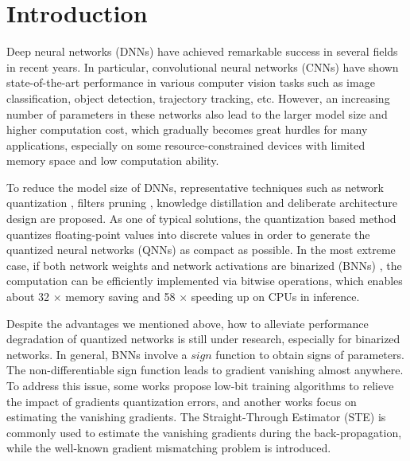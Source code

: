 \documentclass[runningheads]{llncs}
\begin{document}
\section{Introduction}
Deep neural networks (DNNs) have achieved remarkable success in several fields in recent years.
In particular, convolutional neural networks (CNNs) have shown state-of-the-art
performance in various computer vision tasks such as image classification, object detection, trajectory tracking, etc.
However, an increasing number of parameters in these networks also
lead to the larger model size and higher computation cost,
which gradually becomes great hurdles for many applications,
especially on some resource-constrained devices with limited memory space
and low computation ability.

To reduce the model size of DNNs,
representative techniques such as
network quantization \cite{Zhou2016DoReFa,hou2016loss,pact2018,jung2019learning,lahoud2019self},
filters pruning \cite{Luo2017ThiNet,he2017channel,liu2017learning},
knowledge distillation \cite{Hinton2015Distilling,BSS2019,liu2019kr}
and deliberate architecture design \cite{Li2017,cheng2017survey} are proposed.
As one of typical solutions, the quantization based method quantizes
floating-point values into discrete values in order to generate the quantized neural networks (QNNs) as compact as possible.
In the most extreme case,
if both network weights and network activations are binarized (BNNs) \cite{courbariaux2015binaryconnect},
the computation can be efficiently implemented via bitwise operations,
which enables about 32 $\times$ memory saving and 58 $\times$ speeding up \cite{rastegari2016xnor} on CPUs in inference.

Despite the advantages we mentioned above,
how to alleviate performance degradation of quantized networks is still under research,
especially for binarized networks.
In general, BNNs involve a $sign$ function to obtain signs of parameters.
The non-differentiable sign function leads to gradient vanishing almost anywhere.
To address this issue, some works \cite{liu2020bamsprob,Zhu2020} propose low-bit training algorithms to relieve the impact of gradients quantization errors,
and another works focus on estimating the vanishing gradients. The Straight-Through Estimator (STE) \cite{ste2013}
is commonly used to estimate the vanishing gradients during the back-propagation,
while the well-known gradient mismatching problem \cite{yin2019understanding,hou2019analysis,binaryop2019} is introduced.
\end{document}
